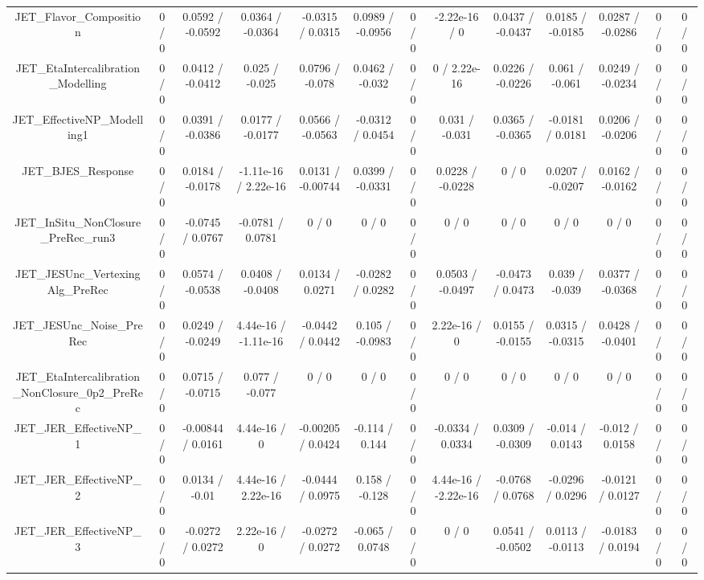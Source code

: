 \documentclass[10pt]{article}
\begin{document}
\begin{table}[htbp]
\begin{center}
\begin{tabular}{|c|c|c|c|c|c|c|c|c|c|c|c|c|}
  JET_Flavor_Composition & 0 / 0 & 0.0592 / -0.0592 & 0.0364 / -0.0364 & -0.0315 / 0.0315 & 0.0989 / -0.0956 & 0 / 0 & -2.22e-16 / 0 & 0.0437 / -0.0437 & 0.0185 / -0.0185 & 0.0287 / -0.0286 & 0 / 0 & 0 / 0 \\ 
  JET_EtaIntercalibration_Modelling & 0 / 0 & 0.0412 / -0.0412 & 0.025 / -0.025 & 0.0796 / -0.078 & 0.0462 / -0.032 & 0 / 0 & 0 / 2.22e-16 & 0.0226 / -0.0226 & 0.061 / -0.061 & 0.0249 / -0.0234 & 0 / 0 & 0 / 0 \\ 
  JET_EffectiveNP_Modelling1 & 0 / 0 & 0.0391 / -0.0386 & 0.0177 / -0.0177 & 0.0566 / -0.0563 & -0.0312 / 0.0454 & 0 / 0 & 0.031 / -0.031 & 0.0365 / -0.0365 & -0.0181 / 0.0181 & 0.0206 / -0.0206 & 0 / 0 & 0 / 0 \\ 
  JET_BJES_Response & 0 / 0 & 0.0184 / -0.0178 & -1.11e-16 / 2.22e-16 & 0.0131 / -0.00744 & 0.0399 / -0.0331 & 0 / 0 & 0.0228 / -0.0228 & 0 / 0 & 0.0207 / -0.0207 & 0.0162 / -0.0162 & 0 / 0 & 0 / 0 \\ 
  JET_InSitu_NonClosure_PreRec_run3 & 0 / 0 & -0.0745 / 0.0767 & -0.0781 / 0.0781 & 0 / 0 & 0 / 0 & 0 / 0 & 0 / 0 & 0 / 0 & 0 / 0 & 0 / 0 & 0 / 0 & 0 / 0 \\ 
  JET_JESUnc_VertexingAlg_PreRec & 0 / 0 & 0.0574 / -0.0538 & 0.0408 / -0.0408 & 0.0134 / 0.0271 & -0.0282 / 0.0282 & 0 / 0 & 0.0503 / -0.0497 & -0.0473 / 0.0473 & 0.039 / -0.039 & 0.0377 / -0.0368 & 0 / 0 & 0 / 0 \\ 
  JET_JESUnc_Noise_PreRec & 0 / 0 & 0.0249 / -0.0249 & 4.44e-16 / -1.11e-16 & -0.0442 / 0.0442 & 0.105 / -0.0983 & 0 / 0 & 2.22e-16 / 0 & 0.0155 / -0.0155 & 0.0315 / -0.0315 & 0.0428 / -0.0401 & 0 / 0 & 0 / 0 \\ 
  JET_EtaIntercalibration_NonClosure_0p2_PreRec & 0 / 0 & 0.0715 / -0.0715 & 0.077 / -0.077 & 0 / 0 & 0 / 0 & 0 / 0 & 0 / 0 & 0 / 0 & 0 / 0 & 0 / 0 & 0 / 0 & 0 / 0 \\ 
  JET_JER_EffectiveNP_1 & 0 / 0 & -0.00844 / 0.0161 & 4.44e-16 / 0 & -0.00205 / 0.0424 & -0.114 / 0.144 & 0 / 0 & -0.0334 / 0.0334 & 0.0309 / -0.0309 & -0.014 / 0.0143 & -0.012 / 0.0158 & 0 / 0 & 0 / 0 \\ 
  JET_JER_EffectiveNP_2 & 0 / 0 & 0.0134 / -0.01 & 4.44e-16 / 2.22e-16 & -0.0444 / 0.0975 & 0.158 / -0.128 & 0 / 0 & 4.44e-16 / -2.22e-16 & -0.0768 / 0.0768 & -0.0296 / 0.0296 & -0.0121 / 0.0127 & 0 / 0 & 0 / 0 \\ 
  JET_JER_EffectiveNP_3 & 0 / 0 & -0.0272 / 0.0272 & 2.22e-16 / 0 & -0.0272 / 0.0272 & -0.065 / 0.0748 & 0 / 0 & 0 / 0 & 0.0541 / -0.0502 & 0.0113 / -0.0113 & -0.0183 / 0.0194 & 0 / 0 & 0 / 0 \\ 

\end{tabular}
\end{center}
\end{table}
\end{document}
